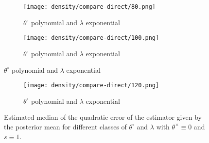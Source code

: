 \begin{figure}\ContinuedFloat
\begin{subfigure}{.7\textwidth}
  \centering
  \texttt{[image: density/compare-direct/80.png]}
  \caption{$\theta^{\circ}$ polynomial and $\lambda$ exponential}
  \label{fig3:sub2}
\end{subfigure}

\begin{subfigure}{.7\textwidth}
  \centering
  \texttt{[image: density/compare-direct/100.png]}
  \caption{$\theta^{\circ}$ polynomial and $\lambda$ exponential}
  \label{fig3:sub2}
\end{subfigure}
\end{figure}

\begin{figure}\ContinuedFloat
\begin{subfigure}{.7\textwidth}
  \centering
  \texttt{[image: density/compare-direct/120.png]}
  \caption{$\theta^{\circ}$ polynomial and $\lambda$ exponential}
  \label{fig3:sub2}
\end{subfigure}
\caption{Estimated median of the quadratic error of the estimator given by the posterior mean for different classes of $\theta^{\circ}$ and $\lambda$ with $\theta^{\times} \equiv 0$ and $s \equiv 1$.}
\label{EQM}
\end{figure}



